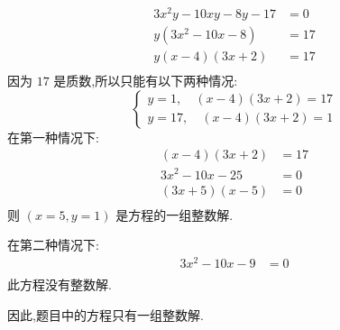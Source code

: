 \documentclass[answers]{exam}
\begin{document}
\begin{questions}
	\begin{solution}
		\begin{align*}
			3x^2y - 10xy - 8y - 17 & = 0  \\
			y(3x^2 - 10x - 8)      & = 17 \\
			y(x-4)(3x+2)           & = 17 \\
		\end{align*}
		因为 \( 17 \) 是质数,所以只能有以下两种情况:
		\begin{equation*}
			\begin{cases}
				y = 1, \quad (x-4)(3x+2) = 17 \\
				y = 17,\quad  (x-4)(3x+2) = 1
			\end{cases}
		\end{equation*}
		在第一种情况下:
		\begin{align*}
			(x-4)(3x+2)     & = 17 \\
			3x^2 -10x - 25  & = 0  \\
			(3x + 5)(x - 5) & = 0  \\
		\end{align*}
		则 \( (x=5, y=1) \) 是方程的一组整数解.

		在第二种情况下:
		\begin{align*}
			3x^2 - 10x - 9 & = 0 \\
		\end{align*}
		此方程没有整数解.

		因此,题目中的方程只有一组整数解.
	\end{solution}


\end{questions}
\end{document}

